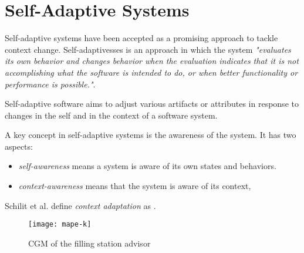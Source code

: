 \section{Self-Adaptive Systems}


Self-adaptive systems have been accepted as a promising approach to tackle context change. Self-adaptivesses is an approach in which the system
\emph{"evaluates its own behavior and changes behavior when the evaluation indicates that it is not accomplishing what the software is intended to do, or when better functionality or performance is possible."}\cite{laddaga_self_1997}.


Self-adaptive software aims to adjust various artifacts or attributes in response to changes in the self and in the context of a software system\cite{salehie_self-adaptive_2009}.

A key concept in self-adaptive systems is the awareness of the system. It has two aspects\cite{salehie_self-adaptive_2009}:
\begin{itemize}
   \item \emph{self-awareness} means a system is aware of its own states and behaviors.
   \item \emph{context-awareness} means that the system is aware of its context,
\end{itemize}


Schilit et al.\cite{klein_survey_2008} define \emph{context adaptation} as .

\begin{figure}[!htb]
 \centering
 \texttt{[image: mape-k]}
 \caption{CGM of the filling station advisor}
\label{fig:goal_model_filling_station_advisor}
\end{figure}



